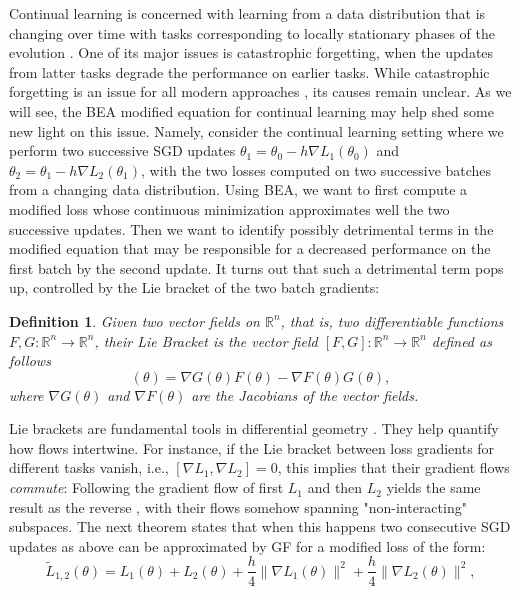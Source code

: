 \documentclass{article}
\newtheorem{definition}[theorem]{Definition}
\newcommand{\R}[0] {\mathbb R}
\begin{document}
Continual learning is concerned with learning from a data distribution that is changing over time with tasks corresponding to locally stationary phases of the evolution \cite{soutifcormerais2023comprehensive,lange2023continual}. One of its major issues is catastrophic forgetting, when the updates from latter tasks degrade the performance on earlier tasks. While catastrophic forgetting is an issue for all modern approaches \cite{soutifcormerais2023comprehensive,lange2023continual, prabhu2020GDumb}, its causes remain unclear. As we will see, the BEA modified equation for continual learning may help shed some new light on this issue.
Namely, consider the continual learning setting where we perform two successive SGD updates $\theta_1 = \theta_0  - h \nabla L_1(\theta_0)$ and $\theta_2 = \theta_1  - h \nabla L_2(\theta_1)$, with the two losses computed on two successive batches from a changing data distribution.
Using BEA, we want to first compute a modified loss whose continuous minimization approximates well the two successive updates. Then we want to identify possibly detrimental terms in the modified equation that may be responsible for a decreased performance on the first batch by the second update. It turns out that such a detrimental term pops up, controlled by the Lie bracket of the two batch gradients:
\begin{definition}
Given two vector fields on $\R^n$, that is, two differentiable functions $F, G:\R^n\rightarrow \R^n$, their Lie Bracket is the vector field $[F, G]:\R^n\rightarrow \R^n$ defined as follows
\begin{equation}
    [F, G] (\theta) = \nabla G(\theta) F(\theta) - \nabla F(\theta) G(\theta),
\end{equation}
where $\nabla G(\theta)$ and $\nabla F(\theta)$ are the Jacobians of the vector fields.
\end{definition}
Lie brackets are fundamental tools in differential geometry \cite{lee2012smooth_manifolds}.
They help quantify how flows intertwine. For instance, if the Lie bracket between loss gradients for different tasks vanish, i.e.,  $[\nabla L_1, \nabla L_2]=0$, this implies that their gradient flows \emph{commute}: Following the gradient flow of first $L_1$ and then $L_2$ yields the same result as the reverse \cite{lee2012smooth_manifolds}, with their flows somehow spanning "non-interacting" subspaces. 
The next theorem states that when this happens two consecutive SGD updates as above can be approximated by GF for a modified loss of the form:
\begin{equation}\label{modified_loss}
    \widetilde L_{1,2}(\theta) = L_1(\theta) + L_2(\theta) + \frac h4 \|\nabla L_1(\theta)\|^2 + \frac h4 \|\nabla L_2(\theta)\|^2,
\end{equation}
\end{document}

